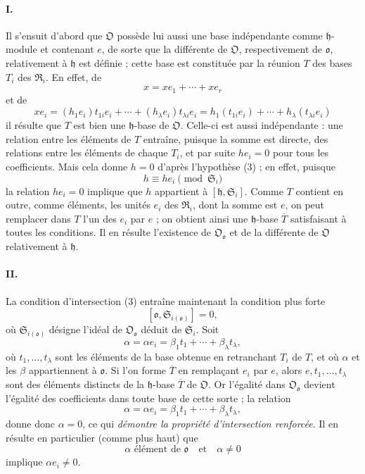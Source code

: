\paragraph{I.}
Il s'ensuit d'abord que $\mathfrak O$ possède lui aussi une base indépendante comme $\mathfrak h$-module et contenant $e$, de sorte que la différente de $\mathfrak O$, respectivement de $\mathfrak o$, relativement à $\mathfrak h$ est définie ; cette base est constituée par la réunion $T$ des bases $T_i$ des $\mathfrak R_i$. En effet, de
\[
x=xe_1+\cdots+xe_r
\]
et de
\[
xe_i=(h_1e_i)t_{1i}e_i+\cdots+(h_\lambda e_i)t_{\lambda i}e_i
=h_1(t_{1i}e_i)+\cdots+h_\lambda(t_{\lambda i}e_i)
\]
il résulte que $T$ est bien une $\mathfrak h$-base de $\mathfrak O$. Celle-ci est aussi indépendante : une relation entre les éléments de $T$ entraîne, puisque la somme est directe, des relations entre les éléments de chaque $T_i$, et par suite $h e_i=0$ pour tous les coefficients. Mais cela donne $h=0$ d'après l'hypothèse (3) ; en effet, puisque
\[
h\equiv h e_i\pmod{\mathfrak S_i}
\]
la relation $h e_i=0$ implique que $h$ appartient à $[\mathfrak h,\mathfrak S_i]$. Comme $T$ contient en outre, comme éléments, les unités $e_i$ des $\mathfrak R_i$, dont la somme est $e$, on peut remplacer dans $T$ l'un des $e_i$ par $e$ ; on obtient ainsi une $\mathfrak h$-base $\overline T$ satisfaisant à toutes les conditions. Il en résulte l'existence de $\mathfrak O_{\mathfrak o}$ et de la différente de $\mathfrak O$ relativement à $\mathfrak h$.

\paragraph{II.}
La condition d'intersection (3) entraîne maintenant la condition plus forte
\[
[\mathfrak o,\mathfrak S_{i(\mathfrak o)}]=0,
\]
où $\mathfrak S_{i(\mathfrak o)}$ désigne l'idéal de $\mathfrak O_{\mathfrak o}$ déduit de $\mathfrak S_i$. Soit
\[
\alpha=\alpha e_i=\beta_1t_1+\cdots+\beta_\lambda t_\lambda,
\]
où $t_1,\ldots,t_\lambda$ sont les éléments de la base obtenue en retranchant $T_i$ de $T$, et où $\alpha$ et les $\beta$ appartiennent à $\mathfrak o$. Si l'on forme $\overline T$ en remplaçant $e_i$ par $e$, alors $e,t_1,\ldots,t_\lambda$ sont des éléments distincts de la $\mathfrak h$-base $\overline T$ de $\mathfrak O$. Or l'égalité dans $\mathfrak O_{\mathfrak o}$ devient l'égalité des coefficients dans toute base de cette sorte ; la relation
\[
\alpha=\alpha e_i=\beta_1t_1+\cdots+\beta_\lambda t_\lambda,
\]
donne donc $\alpha=0$, ce qui \emph{démontre la propriété d'intersection renforcée}. Il en résulte en particulier (comme plus haut) que
\[
\alpha\text{ élément de }\mathfrak o\quad\text{et}\quad\alpha\ne0
\]
implique $\alpha e_i\ne0$.

